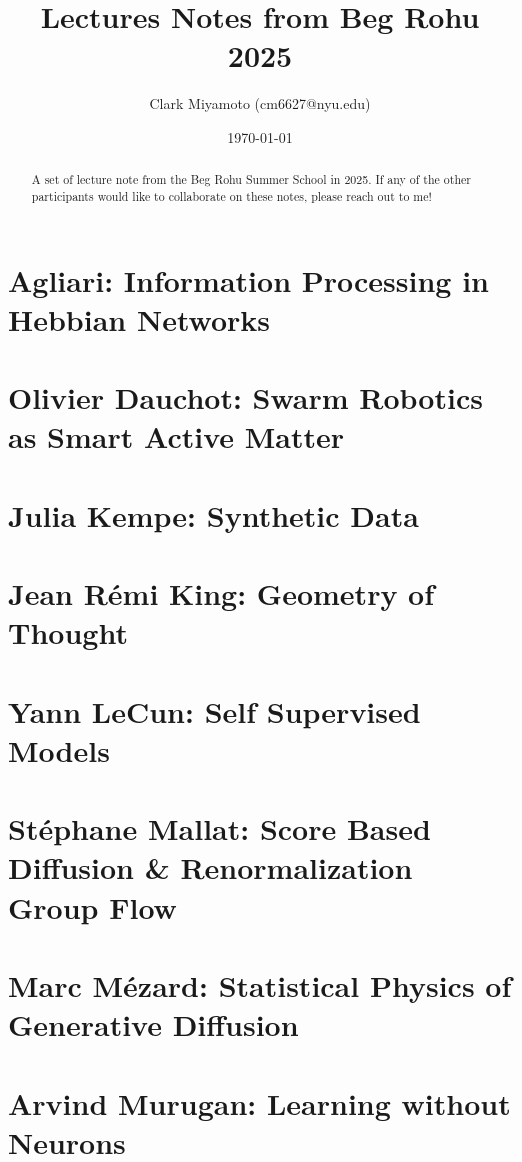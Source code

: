 \documentclass[12pt,fleqn]{article}
\title{Lectures Notes from Beg Rohu 2025}
\author{Clark Miyamoto (cm6627@nyu.edu)}
\date{\today}
\numberwithin{equation}{section} %
\begin{document}
\maketitle
\begin{abstract}
	A set of lecture note from the Beg Rohu Summer School in 2025. If any of the other participants would like to collaborate on these notes, please reach out to me!
\end{abstract}

\tableofcontents
\newpage

\part{Agliari: Information Processing in Hebbian Networks}

\newpage

\part{Olivier Dauchot: Swarm Robotics as Smart Active Matter}

\newpage

\part{Julia Kempe: Synthetic Data}

\newpage

\part{Jean R\'emi King: Geometry of Thought}

\newpage

\part{Yann LeCun: Self Supervised Models}

\newpage

\part{St\'ephane Mallat: Score Based Diffusion \& Renormalization Group Flow}

\newpage

\part{Marc M\'ezard: Statistical Physics of Generative Diffusion}

\newpage

\part{Arvind Murugan: Learning without Neurons}

\newpage
\end{document}
